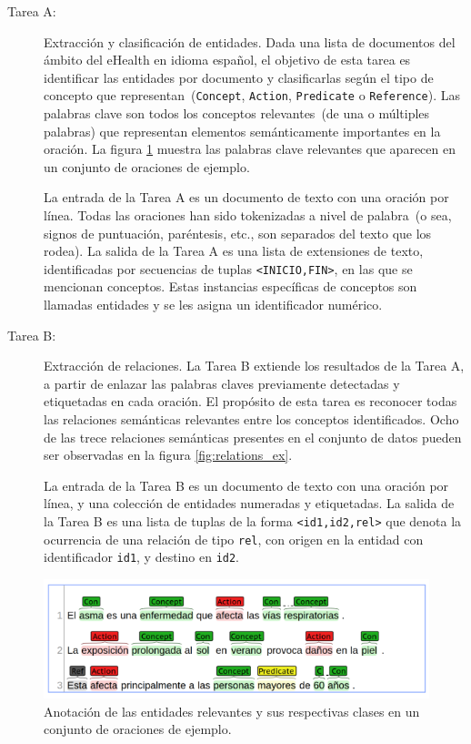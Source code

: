 \begin{description}
	\item[Tarea A:] Extracción y clasificación de entidades.
	Dada una lista de documentos del ámbito del eHealth en idioma español, el objetivo de	esta tarea es identificar las entidades por documento y clasificarlas según el tipo de concepto que representan~(\texttt{Concept}, \texttt{Action}, \texttt{Predicate} o \texttt{Reference}).
	Las palabras clave son todos los conceptos relevantes~(de una o múltiples palabras) que representan elementos
	semánticamente importantes en la oración.
	La figura \ref{fig:entites_ex} muestra las palabras clave relevantes que aparecen en un conjunto de oraciones de ejemplo.
	
	La entrada de la Tarea A es un documento de texto con una oración	por línea. Todas las oraciones han sido tokenizadas a nivel de palabra~(o sea, signos de puntuación, paréntesis, etc., son separados del texto que los rodea).
	La salida de la Tarea A es una lista de extensiones de texto, identificadas por secuencias de tuplas \texttt{<INICIO,FIN>}, en las que se mencionan conceptos.
	Estas instancias específicas de conceptos son llamadas entidades y se les asigna un identificador numérico.
	
	\item[Tarea B:] Extracción de relaciones.
	La Tarea B extiende los resultados de la Tarea A, a partir de enlazar las palabras claves previamente detectadas y etiquetadas en cada oración.
	El propósito de esta tarea es reconocer todas las relaciones semánticas relevantes entre los conceptos identificados.
	Ocho de las trece relaciones semánticas presentes en el conjunto de datos pueden ser observadas en la figura \ref{fig:relations_ex}.
		
	La entrada de la Tarea B es un documento de texto con una oración	por línea, y una colección de entidades numeradas y etiquetadas.
	La salida de la Tarea B es una lista de tuplas de la forma \texttt{<id1,id2,rel>} que denota la ocurrencia de una relación de tipo \texttt{rel}, con origen en la entidad con identificador \texttt{id1}, y destino en \texttt{id2}.
	
\end{description} 
	
\begin{figure}[h!]
	\centering
	\includegraphics[width=0.9\linewidth]{Graphics/entities.png}
	\caption{Anotación de las entidades relevantes y sus respectivas clases en un conjunto de oraciones de ejemplo.} \label{fig:entites_ex}
\end{figure}


